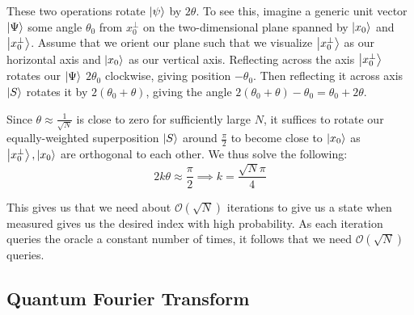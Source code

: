 These two operations rotate $\ket{\psi}$ by $2\theta$. To see this, imagine a generic unit vector $\ket{\Psi}$ some angle $\theta_0$ from $x_0^{\perp}$ on the two-dimensional plane spanned by $\ket{x_0}$ and $\ket{x_0^{\perp}}$. Assume that we orient our plane such that we visualize $\ket{x_0^{\perp}}$ as our horizontal axis and $\ket{x_0}$ as our vertical axis. Reflecting across the axis $\ket{x_0^{\perp}}$ rotates our $\ket{\Psi}$ $2\theta_0$ clockwise, giving position $-\theta_0$. Then reflecting it across axis $\ket{S}$ rotates it by $2(\theta_0 + \theta)$, giving the angle $2(\theta_0 + \theta) - \theta_0 = \theta_0 + 2\theta$.

Since $\theta \approx \frac{1}{\sqrt{N}}$ is close to zero for sufficiently large $N$, it suffices to rotate our equally-weighted superposition $\ket{S}$ around $\frac{\pi}{2}$ to become close to $\ket{x_0}$ as $\ket{x_0^{\perp}},\ket{x_0}$ are orthogonal to each other. We thus solve the following:
$$2k\theta \approx \frac{\pi}{2} \implies k = \frac{\sqrt{N}\pi}{4} $$

This gives us that we need about $\mathcal{O}(\sqrt{N})$ iterations to give us a state when measured gives us the desired index with high probability. As each iteration queries the oracle a constant number of times, it follows that we need $\mathcal{O}(\sqrt{N})$ queries.

\subsection{Quantum Fourier Transform}

